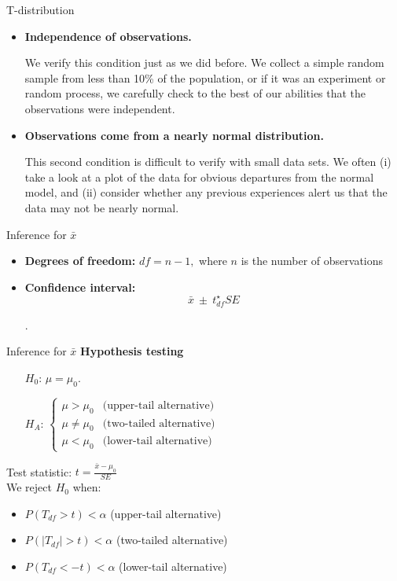 \documentclass[12pt,a4paper]{beamer}
\begin{document}
\begin{frame}{T-distribution}
	\begin{itemize}
	\item \textbf{Independence of observations.}
	
	 We verify this condition just as we did before. We collect a simple random sample from less than 10\% of the population, or if it was an experiment or random process, we carefully check to the best of our abilities that the observations were independent.
	\item \textbf{Observations come from a nearly normal distribution.}
	
	 This second condition is difficult to verify with small data sets. We often (i) take a look at a plot of the data for obvious departures from the normal model, and (ii) consider whether any previous experiences alert us that the data may not be nearly normal.
	\end{itemize}
\end{frame}
\begin{frame}{Inference for $\bar{x}$}
	\begin{itemize}
		\item  \textbf{Degrees of freedom:} $df=n-1,$ where $n$ is the number of observations
		\vspace{0.3cm}
		\item \textbf{Confidence interval:}
		\[\bar{x} \ \pm\  t^{\star}_{df}SE\]

		.
	\end{itemize}
	

\end{frame}
\begin{frame}{Inference for $\bar{x}$}
	 \textbf{Hypothesis testing}
			\small\begin{itemize}
			\setlength{\itemsep}{0mm}
			\item[$H_0$:] $\mu = \mu_0$.
			\item[$H_A$:]$\left\{
			\begin{array}{ll}
				\mu>\mu_0& \text{(upper-tail alternative)}\\
				\mu\neq\mu_0& \text{(two-tailed alternative)}\\
				\mu< \mu_0& \text{(lower-tail alternative)}
			\end{array}
			\right.$
		\end{itemize}
		Test statistic: $t=\frac{\bar{x}-\mu_0}{SE}$\\
		We reject $H_0$ when:
		\begin{itemize}
			\item $P(T_{df}>t)<\alpha$ (upper-tail alternative)
			\item $P(|T_{df}|>t)<\alpha$ (two-tailed alternative)
			\item $P(T_{df}<-t)<\alpha$ (lower-tail alternative)
	\end{itemize}
\end{frame}
\end{document}
